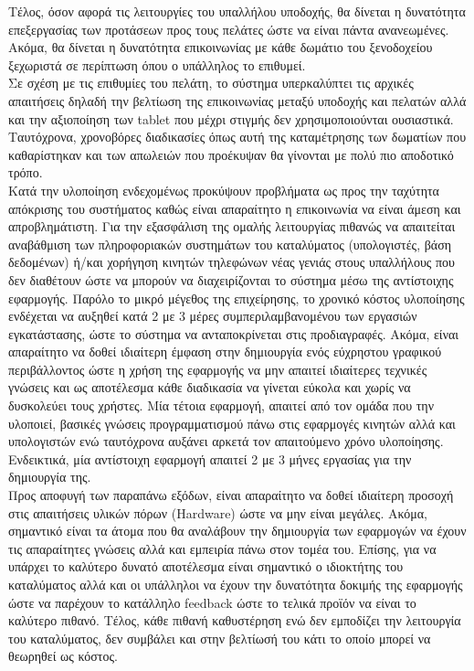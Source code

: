 \noindent
Τέλος, όσον αφορά τις λειτουργίες του υπαλλήλου υποδοχής, θα δίνεται η δυνατότητα επεξεργασίας των
προτάσεων προς τους πελάτες ώστε να είναι πάντα ανανεωμένες. Ακόμα, θα δίνεται η δυνατότητα επικοινωνίας
με κάθε δωμάτιο του ξενοδοχείου ξεχωριστά σε περίπτωση όπου ο υπάλληλος το επιθυμεί.\\

\noindent
Σε σχέση με τις επιθυμίες του πελάτη, το σύστημα υπερκαλύπτει τις αρχικές απαιτήσεις δηλαδή την 
βελτίωση της επικοινωνίας μεταξύ υποδοχής και πελατών αλλά και την αξιοποίηση των tablet που μέχρι 
στιγμής δεν χρησιμοποιούνται ουσιαστικά. Ταυτόχρονα, χρονοβόρες διαδικασίες όπως αυτή της 
καταμέτρησης των δωματίων που καθαρίστηκαν και των απωλειών που προέκυψαν θα γίνονται με πολύ πιο 
αποδοτικό τρόπο. \\

\noindent
Κατά την υλοποίηση ενδεχομένως προκύψουν προβλήματα ως προς την ταχύτητα απόκρισης του συστήματος 
καθώς είναι απαραίτητο η επικοινωνία να είναι άμεση και απροβλημάτιστη. Για την εξασφάλιση της ομαλής 
λειτουργίας πιθανώς να απαιτείται αναβάθμιση των πληροφοριακών συστημάτων του καταλύματος 
(υπολογιστές, βάση δεδομένων) ή/και χορήγηση κινητών τηλεφώνων νέας γενιάς στους υπαλλήλους που δεν 
διαθέτουν ώστε  να μπορούν να διαχειρίζονται το σύστημα μέσω της αντίστοιχης εφαρμογής. Παρόλο το 
μικρό μέγεθος της επιχείρησης, το χρονικό κόστος υλοποίησης ενδέχεται να αυξηθεί κατά 2 με 3 μέρες  
συμπεριλαμβανομένου των εργασιών εγκατάστασης, ώστε το σύστημα να ανταποκρίνεται στις προδιαγραφές.
Ακόμα, είναι απαραίτητο να δοθεί ιδιαίτερη έμφαση στην δημιουργία ενός εύχρηστου γραφικού 
περιβάλλοντος ώστε η χρήση της εφαρμογής να μην απαιτεί ιδιαίτερες τεχνικές γνώσεις και ως αποτέλεσμα 
κάθε διαδικασία να γίνεται εύκολα και χωρίς να δυσκολεύει τους χρήστες. Μία τέτοια εφαρμογή, απαιτεί 
από τον ομάδα που την υλοποιεί, βασικές γνώσεις προγραμματισμού πάνω στις εφαρμογές κινητών αλλά και 
υπολογιστών ενώ ταυτόχρονα αυξάνει αρκετά τον απαιτούμενο χρόνο υλοποίησης. Ενδεικτικά, μία 
αντίστοιχη εφαρμογή  απαιτεί 2 με 3 μήνες εργασίας για την δημιουργία της.\\ 

\noindent
Προς αποφυγή των παραπάνω εξόδων, είναι απαραίτητο να δοθεί ιδιαίτερη προσοχή στις απαιτήσεις υλικών 
πόρων (Hardware) ώστε να μην είναι μεγάλες. Ακόμα, σημαντικό είναι τα άτομα που θα αναλάβουν την 
δημιουργία των εφαρμογών να έχουν τις απαραίτητες γνώσεις αλλά και εμπειρία πάνω στον τομέα του. 
Επίσης, για να υπάρχει το καλύτερο δυνατό αποτέλεσμα είναι σημαντικό ο ιδιοκτήτης του καταλύματος 
αλλά και οι υπάλληλοι να έχουν την δυνατότητα δοκιμής της εφαρμογής ώστε να παρέχουν το κατάλληλο 
feedback ώστε το τελικά προϊόν να είναι το καλύτερο πιθανό. Τέλος, κάθε πιθανή καθυστέρηση ενώ δεν 
εμποδίζει την λειτουργία του καταλύματος, δεν συμβάλει και στην βελτίωσή του κάτι το οποίο μπορεί να 
θεωρηθεί ως κόστος.
		
		
		    